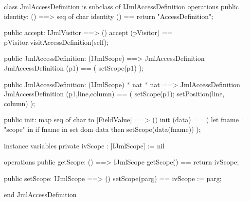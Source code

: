 \begin{vdm_al}
class JmlAccessDefinition is subclass of IJmlAccessDefinition
operations
  public identity: () ==> seq of char
  identity () == return "AccessDefinition";

  public accept: IJmlVisitor ==> ()
  accept (pVisitor) == pVisitor.visitAccessDefinition(self);

  public JmlAccessDefinition:
    (IJmlScope) ==> JmlAccessDefinition
  JmlAccessDefinition (p1) == 
    ( setScope(p1) );

  public JmlAccessDefinition:
    (IJmlScope) *
    nat *
    nat ==> JmlAccessDefinition
  JmlAccessDefinition (p1,line,column) == 
    ( setScope(p1);
      setPosition(line, column) );

  public init: map seq of char to [FieldValue] ==> ()
  init (data) ==
    ( let fname = "scope" in
        if fname in set dom data
        then setScope(data(fname)) );

instance variables
  private ivScope : [IJmlScope] := nil

operations
  public getScope: () ==> IJmlScope
  getScope() == return ivScope;

  public setScope: IJmlScope ==> ()
  setScope(parg) == ivScope := parg;

end JmlAccessDefinition
\end{vdm_al}

